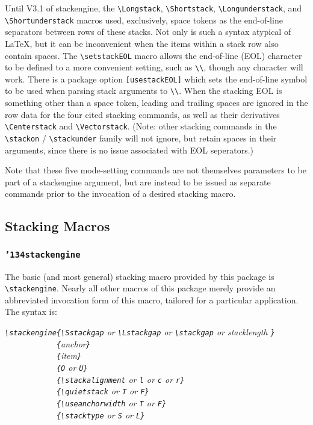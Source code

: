\documentclass{article}
\def\ste{\textsf{stackengine}}
\let\vb\verb
\newcommand\margtt[1]{\marginpar{\hfill\ttfamily#1}}
\newcommand\margcmd[1]{\marginpar{\hfill\ttfamily\char'134#1}}
\newcommand\cmd[1]{\texttt{\char'134#1}}
\begin{document}
Until V3.1 of \ste, the \vb|\Longstack|, \vb|\Shortstack|, 
\vb|\Longunderstack|, and \vb|\Shortunderstack| macros used,
exclusively, space tokens as the end-of-line separators between
rows of these stacks.  Not only is such a syntax atypical of \LaTeX{}, 
but it can be inconvenient when the items within a stack row
also contain spaces.  The \vb|\setstackEOL| 
\margcmd{setstackEOL}macro allows the end-of-line (EOL)
character to be defined to a more convenient setting, such as \vb|\\|,
though any character will work.  There is a package option 
\vb|[usestackEOL]| \margtt{[usestackEOL]\rmfamily\\\raggedleft package
option} which sets the end-of-line symbol to be used when parsing stack
arguments to \vb|\\|.  When the stacking EOL is something other than a
space token, leading and trailing spaces are ignored in the row data for
the four cited stacking commands, as well as their derivatives 
\vb|\Centerstack| and \vb|\Vectorstack|.  (Note: other stacking commands
in the \vb|\stackon| / \vb|\stackunder| family will not ignore, but
retain spaces in their arguments, since there is no issue associated
with EOL seperators.)

Note that these five mode-setting commands are not themselves parameters
to be part of a {\ste} argument, but are instead to be issued as separate
commands prior to the invocation of a desired stacking macro.

\subsection{Stacking Macros}

\subsubsection{\cmd{stackengine}\label{s:stackeng}}

The basic (and most general) stacking macro provided by this package is
\vb|\stackengine|.  Nearly all other macros of this package merely
provide an abbreviated invocation form of this macro, tailored for a
particular application.  The syntax is:

\itshape
\vb|\stackengine{\Sstackgap| or
  \vb|\Lstackgap| or
  \vb|\stackgap| or stacklength%
  \vb|}|\\
\vb|            {|anchor\vb|}|\\
\vb|            {|item\vb|}|\\
\vb|            {O| or \vb|U}|\\
\vb|            {\stackalignment| or
  \vb|l| or
  \vb|c| or
  \vb|r}|\\
\vb|            {\quietstack| or \vb|T| or \vb|F}|\\
\vb|            {\useanchorwidth| or \vb|T| or \vb|F}|\\
\vb|            {\stacktype| or \vb|S| or \vb|L}|
\upshape
\end{document}

